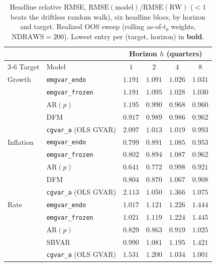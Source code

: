 \documentclass[11pt]{article}
\theoremstyle{definition}
\theoremstyle{remark}
\begin{document}
\begin{table}[!ht]
\centering
\caption{Headline relative RMSE, $\mathrm{RMSE(model)}/\mathrm{RMSE(RW)}$
($<1$ beats the driftless random walk), six headline blocs, by horizon and
target. Realized OOS sweep (rolling as-of-$t_0$ weights, $\mathrm{NDRAWS}=200$).
Lowest entry per (target, horizon) in \textbf{bold}.}
\label{tab:empirical:relrmse}
\begin{tabular}{llcccc}
\toprule
& & \multicolumn{4}{c}{Horizon $h$ (quarters)}\\
\cmidrule(lr){3-6}
Target & Model & $1$ & $2$ & $4$ & $8$ \\
\midrule
Growth    & \texttt{emgvar\_endo}   & $1.191$ & $1.091$ & $1.026$ & $1.031$ \\
          & \texttt{emgvar\_frozen} & $1.191$ & $1.095$ & $1.028$ & $1.030$ \\
          & AR$(p)$                 & $1.195$ & $0.990$ & $0.968$ & $0.960$ \\
          & DFM                     & $\mathbf{0.917}$ & $0.989$ & $0.986$ & $\mathbf{0.962}$ \\
          & \texttt{cgvar\_a} (OLS GVAR) & $2.097$ & $1.013$ & $1.019$ & $0.993$ \\
\midrule
Inflation & \texttt{emgvar\_endo}   & $0.799$ & $0.891$ & $1.085$ & $0.953$ \\
          & \texttt{emgvar\_frozen} & $0.802$ & $0.894$ & $1.087$ & $0.962$ \\
          & AR$(p)$                 & $\mathbf{0.641}$ & $\mathbf{0.772}$ & $\mathbf{0.998}$ & $0.921$ \\
          & DFM                     & $0.804$ & $0.870$ & $1.067$ & $0.908$ \\
          & \texttt{cgvar\_a} (OLS GVAR) & $2.113$ & $1.050$ & $1.366$ & $1.075$ \\
\midrule
Rate      & \texttt{emgvar\_endo}   & $1.017$ & $1.121$ & $1.226$ & $1.444$ \\
          & \texttt{emgvar\_frozen} & $1.021$ & $1.119$ & $1.224$ & $1.445$ \\
          & AR$(p)$                 & $0.829$ & $\mathbf{0.863}$ & $\mathbf{0.919}$ & $1.025$ \\
          & SBVAR                   & $\mathbf{0.990}$ & $1.081$ & $1.195$ & $1.421$ \\
          & \texttt{cgvar\_a} (OLS GVAR) & $1.531$ & $1.200$ & $1.034$ & $\mathbf{1.001}$ \\
\bottomrule
\end{tabular}
\end{table}
\end{document}
